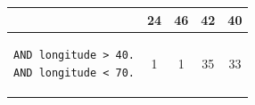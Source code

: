 \documentclass[xcolor=table]{beamer}
\begin{document}
\begin{frame}[fragile]
\begin{center}
\begin{tabular}{|l|c|c|c|c|}
& \cellcolor{red}24 & \cellcolor{green}46 & \cellcolor{green}42 & \cellcolor{green}40 \\
	\hline
\begin{lstlisting}
AND longitude > 40.
AND longitude < 70.
\end{lstlisting}
& \cellcolor{red}1 & \cellcolor{red}1 & \cellcolor{green}35 & \cellcolor{green}33 \\
	\hline
\end{tabular}
\end{center}
\end{frame}
\end{document}
